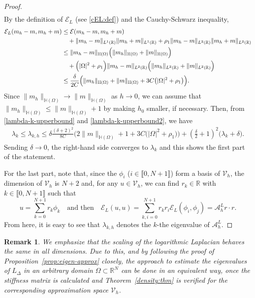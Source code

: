 \documentclass[10 pt]{article}
\newcommand\inter[1]{\llbracket #1\rrbracket}
\newtheorem{remark}[theorem]{Remark}
\numberwithin{equation}{section}
\def\R{\mathbb{R}}
\def\mH{\mathbb{H}}
\begin{document}
\begin{proof}
\begin{align}
\end{align}
By the definition of $\mathcal{E}_L$ (see \eqref{cEL:def}) and the Cauchy-Schwarz inequality,
% 
\begin{align}\notag 
\mathcal{E}_L(m_h-m,m_h+m)&\leq \mathcal{E}(m_h-m,m_h+m)\\ \notag
&\quad +\|m_h-m\|_{L^1(\R)}\|m_h+m\|_{L^1(\R)}+\rho_1\|m_h-m\|_{L^2(\R)}\|m_h+m\|_{L^2(\R)}\notag\\
&\leq \|m_h-m\|_{\mH(\Omega)}\Big(\|m_h\|_{\mH(\Omega)}+\|m\|_{\mH(\Omega)}\Big)\\
&\quad +\Big(|\Omega|^2+\rho_1\Big)\|m_h-m\|_{L^2(\R)}\Big(\|m_h\|_{L^2(\R)}+\|m\|_{L^2(\R)}\Big)\notag\\
&\leq \frac{\delta}{2C}\Big(\|m_h\|_{\mH(\Omega)}+\|m\|_{\mH(\Omega)}+3C\big(|\Omega|^2+\rho_1\big)\Big).\label{lambda-k-upperbound2}
\end{align}
%
Since $\|m_h\|_{\mH(\Omega)}\to \|m\|_{\mH(\Omega)}$ as $h\to 0$, we can assume that
$\|m_h\|_{\mH(\Omega)}\leq \|m\|_{\mH(\Omega)}+1$ by making $h_0$ smaller, if necessary. Then, from \eqref{lambda-k-upperbound} and \eqref{lambda-k-upperbound2}, we have
\begin{align*}
\lambda_k\leq \lambda_{k,h}
\leq 
\delta\frac{(\delta+2)^2}{8C}\Big(2\|m\|_{\mH(\Omega)}+1+3C\big(|\Omega|^2+\rho_1\big)\Big)
+
\left( \frac{\delta}{2}+1\right)^2\big(\lambda_k+\delta\big).
\end{align*}
Sending $\delta\to 0$, the right-hand side converges to $\lambda_k$ and this shows the first part of the statement. 

For the last part, note that, since the $\phi_i$ ($i\in\inter{0,N+1}$) form a basis of $\mathcal{V}_h$, the dimension of $\mathcal{V}_{h}$ is $N+2$ and, for any $u\in \mathcal{V}_{h}$, we can find $r_k\in \R$ with $k\in \inter{0,N+1}$ such that
$$
u=\sum_{k=0}^{N+1}r_k\phi_k\quad\text{and then}\quad \mathcal{E}_L(u,u)=\sum_{k,i=0}^{N+1}r_kr_i\mathcal{E}_L(\phi_i,\phi_j)= \mathcal{A}^L_h r\cdot r.
$$
From here, it is easy to see that $\lambda_{k,h}$ denotes the $k$-the eigenvalue of $\mathcal{A}^L_{h}$.
\end{proof}



\begin{remark}
We emphasize that the scaling of the logarithmic Laplacian behaves the same in all dimensions. Due to this, and by following the proof of Proposition~\ref{prop:eigen-approx} closely, the approach to estimate the eigenvalues of $L_{\Delta}$ in an arbitrary domain $\Omega\subset\R^N$ can be done in an equivalent way, once the stiffness matrix is calculated and Theorem~\ref{density:thm} is verified for the corresponding approximation space $\mathcal{V}_h$.
\end{remark}
\end{document}
